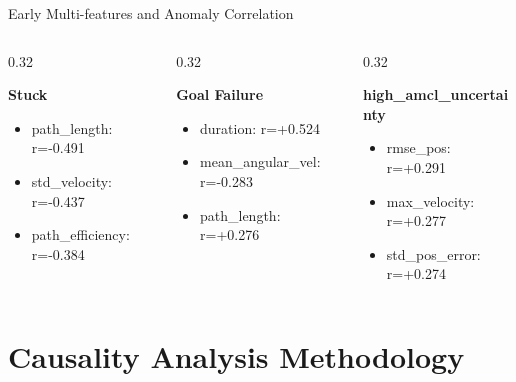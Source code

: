 \documentclass[aspectratio=169, 11pt]{beamer}
\newcommand{\fullsectiontitle}{}
\newcommand{\presentationsection}[2][]{%
  \gdef\fullsectiontitle{#2}%
  \section[#1]{#2}%
}
\begin{document}
\begin{frame}{Early Multi-features and Anomaly Correlation}
  \begin{columns}[T]
    \begin{column}{0.32\textwidth}
      \begin{block}{\textbf{Stuck}}
        \footnotesize
        \begin{itemize}
          \item path\_length: r=-0.491 
          \item std\_velocity: r=-0.437 
          \item path\_efficiency: r=-0.384 
        \end{itemize}
      \end{block}
    \end{column}
    
    \begin{column}{0.32\textwidth}
      \begin{block}{\textbf{Goal Failure}}
        \footnotesize
        \begin{itemize}
          \item duration: r=+0.524 
          \item mean\_angular\_vel: r=-0.283 
          \item path\_length: r=+0.276 
        \end{itemize}
      \end{block}
    \end{column}
    
    \begin{column}{0.32\textwidth}
      \begin{block}{\textbf{high\_amcl\_uncertainty}}
        \footnotesize
        \begin{itemize}
          \item rmse\_pos: r=+0.291 
          \item max\_velocity: r=+0.277 
          \item std\_pos\_error: r=+0.274 
        \end{itemize}
      \end{block}
    \end{column}
  \end{columns}
\end{frame}

\presentationsection[Causality Analysis Methodology]{Causality Analysis Methodology}
\end{document}

